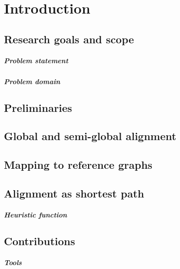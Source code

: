 \chapter{Introduction}

\graphicspath{{\dir/}}

\label{ch:introduction}

\section{Research goals and scope}
\paragraph{Problem statement}
\paragraph{Problem domain}

\section{Preliminaries}

\section{Global and semi-global alignment}

\section{Mapping to reference graphs}

\section{Alignment as shortest path}


\paragraph{Heuristic function}

\section{Contributions}

\paragraph{Tools}


